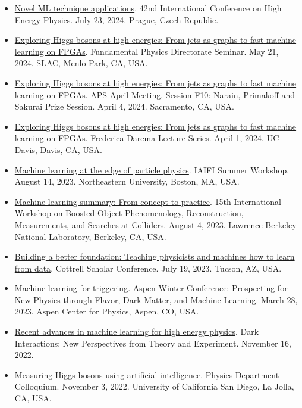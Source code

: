\documentclass[11pt]{res}
\begin{document}
\begin{resume}
\begin{itemize}
    \item \href{https://indico.cern.ch/event/1291157/contributions/5958213/}{Novel ML technique applications}. 42nd International Conference on High Energy Physics. July 23, 2024. Prague, Czech Republic.
    \item \href{https://indico.slac.stanford.edu/event/8784/}{Exploring Higgs bosons at high energies: From jets as graphs to fast machine learning on FPGAs}. Fundamental Physics Directorate Seminar. May 21, 2024. SLAC, Menlo Park, CA, USA.
    \item \href{https://meetings.aps.org/Meeting/APR24/Session/F10.2}{Exploring Higgs bosons at high energies: From jets as graphs to fast machine learning on FPGAs}. APS April Meeting. Session F10: Narain, Primakoff and Sakurai Prize Session. April 4, 2024. Sacramento, CA, USA.
    \item \href{https://daremalectures.physics.ucdavis.edu/speakers/}{Exploring Higgs bosons at high energies: From jets as graphs to fast machine learning on FPGAs}. Frederica Darema Lecture Series. April 1, 2024. UC Davis, Davis, CA, USA.
    \item \href{https://iaifi.org/summer-workshop.html}{Machine learning at the edge of particle physics}. IAIFI Summer Workshop. August 14, 2023. Northeastern University, Boston, MA, USA.
    \item \href{https://indico.physics.lbl.gov/event/975/contributions/8195/}{Machine learning summary: From concept to practice}. 15th International Workshop on Boosted Object Phenomenology, Reconstruction, Measurements, and Searches at Colliders. August 4, 2023. Lawrence Berkeley National Laboratory, Berkeley, CA, USA.
    \item \href{https://rescorp.org/cottrell-scholars/cottrell-scholars-conference}{Building a better foundation: Teaching physicists and machines how to learn from data}. Cottrell Scholar Conference. July 19, 2023. Tucson, AZ, USA.
    \item \href{https://indico.fnal.gov/event/21471/contributions/259113/}{Machine learning for triggering}. Aspen Winter Conference: Prospecting for New Physics through Flavor, Dark Matter, and Machine Learning. March 28, 2023. Aspen Center for Physics, Aspen, CO, USA.
    \item \href{https://indico.cern.ch/event/1211501/contributions/5128872/}{Recent advances in machine learning for high energy physics}. Dark Interactions: New Perspectives from Theory and Experiment. November 16, 2022.
    \item \href{https://indico.cern.ch/event/1219204/}{Measuring Higgs bosons using artificial intelligence}. Physics Department Colloquium. November 3, 2022. University of California San Diego, La Jolla, CA, USA.

\end{itemize}
\end{resume}
\end{document}
